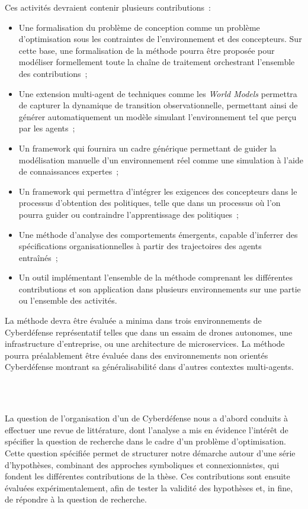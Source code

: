 \noindent Ces activités devraient contenir plusieurs contributions~:
\begin{itemize}
    \item Une formalisation du problème de conception comme un problème d'optimisation sous les contraintes de l'environnement et des concepteurs. Sur cette base, une formalisation de la méthode pourra être proposée pour modéliser formellement toute la chaîne de traitement orchestrant l'ensemble des contributions~;
    \item Une extension multi-agent de techniques  comme les \textit{World Models} permettra de capturer la dynamique de transition observationnelle, permettant ainsi de générer automatiquement un modèle simulant l'environnement tel que perçu par les agents~;
    \item Un framework qui fournira un cadre générique permettant de guider la modélisation manuelle d'un environnement réel comme une simulation à l'aide de connaissances expertes~;
    \item Un framework qui permettra d'intégrer les exigences des concepteurs dans le processus d'obtention des politiques, telle que dans un processus  où l'on pourra guider ou contraindre l'apprentissage des politiques~;
    \item Une méthode d'analyse des comportements émergents, capable d'inferrer des spécifications organisationnelles à partir des trajectoires des agents entraînés~;
    \item Un outil implémentant l'ensemble de la méthode comprenant les différentes contributions et son application dans plusieurs environnements sur une partie ou l'ensemble des activités.
\end{itemize}

\noindent La méthode devra être évaluée a minima dans trois environnements de Cyberdéfense représentatif telles que dans un essaim de drones autonomes, une infrastructure d'entreprise, ou une architecture de microservices. La méthode pourra préalablement être évaluée dans des environnements non orientés Cyberdéfense montrant sa généralisabilité dans d'autres contextes multi-agents.

\

\bigskip

\\

\noindent
La question de l’organisation d’un  de Cyberdéfense nous a d’abord conduits à effectuer une revue de littérature, dont l’analyse a mis en évidence l’intérêt de spécifier la question de recherche dans le cadre d'un problème d’optimisation. Cette question spécifiée permet de structurer notre démarche autour d’une série d’hypothèses, combinant des approches symboliques et connexionnistes, qui fondent les différentes contributions de la thèse. Ces contributions sont ensuite évaluées expérimentalement, afin de tester la validité des hypothèses et, in fine, de répondre à la question de recherche.

